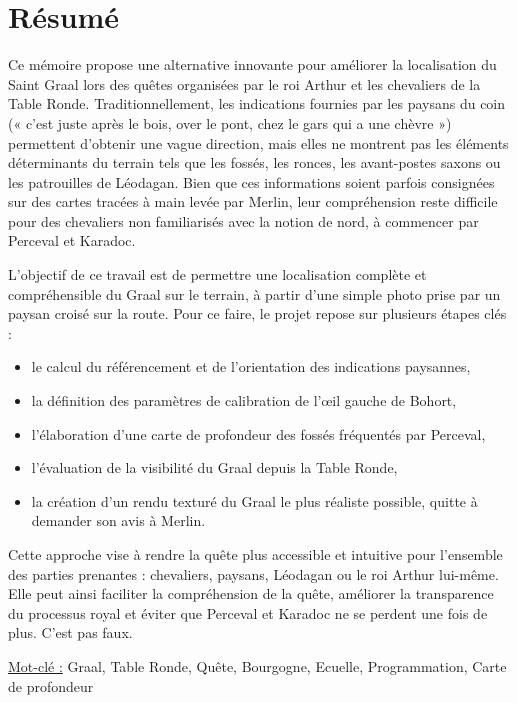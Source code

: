 \section*{Résumé}
Ce mémoire propose une alternative innovante pour améliorer la localisation du Saint Graal lors des quêtes organisées par le roi Arthur et les chevaliers de la Table Ronde. Traditionnellement, les indications fournies par les paysans du coin (« c'est juste après le bois, over le pont, chez le gars qui a une chèvre ») permettent d'obtenir une vague direction, mais elles ne montrent pas les éléments déterminants du terrain tels que les fossés, les ronces, les avant-postes saxons ou les patrouilles de Léodagan. Bien que ces informations soient parfois consignées sur des cartes tracées à main levée par Merlin, leur compréhension reste difficile pour des chevaliers non familiarisés avec la notion de nord, à commencer par Perceval et Karadoc.

L'objectif de ce travail est de permettre une localisation complète et compréhensible du Graal sur le terrain, à partir d'une simple photo prise par un paysan croisé sur la route. Pour ce faire, le projet repose sur plusieurs étapes clés :
\begin{itemize}
    \item le calcul du référencement et de l'orientation des indications paysannes,
    \item la définition des paramètres de calibration de l'œil gauche de Bohort,
    \item l'élaboration d'une carte de profondeur des fossés fréquentés par Perceval,
    \item l'évaluation de la visibilité du Graal depuis la Table Ronde,
    \item la création d'un rendu texturé du Graal le plus réaliste possible, quitte à demander son avis à Merlin.
\end{itemize}
Cette approche vise à rendre la quête plus accessible et intuitive pour l'ensemble des parties prenantes : chevaliers, paysans, Léodagan ou le roi Arthur lui-même. Elle peut ainsi faciliter la compréhension de la quête, améliorer la transparence du processus royal et éviter que Perceval et Karadoc ne se perdent une fois de plus. C'est pas faux.

\vspace{0.5cm}
\underline{Mot-clé :}
Graal, Table Ronde, Quête, Bourgogne, Ecuelle, Programmation, Carte de profondeur

